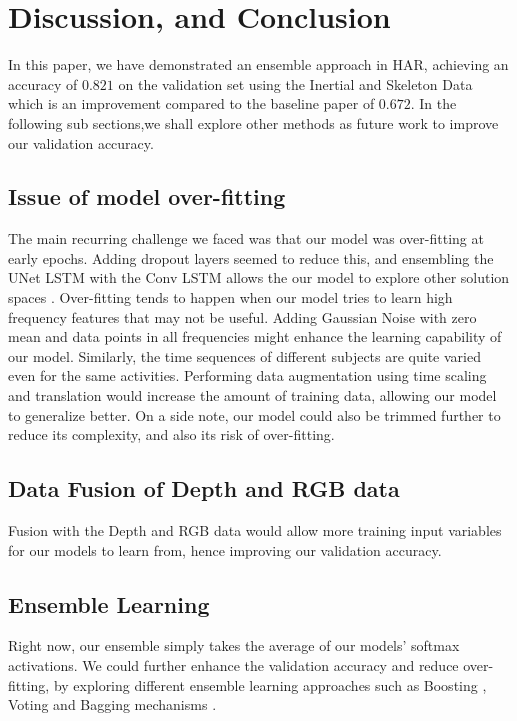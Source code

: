 \documentclass[conference]{IEEEtran}
\begin{document}
\section{Discussion, and Conclusion}
In this paper, we have demonstrated an ensemble approach in HAR, achieving an accuracy of $0.821$ on the validation set using the Inertial and Skeleton Data which is an improvement compared to the baseline paper of $0.672$. In the following sub sections,we shall explore other methods as future work to improve our validation accuracy. 
\subsection{Issue of model over-fitting}
The main recurring challenge we faced was that our model was over-fitting at early epochs. Adding dropout layers seemed to reduce this, and ensembling the UNet LSTM with the Conv LSTM allows the our model to explore other solution spaces \cite{abs-1106-0257}. Over-fitting tends to happen when our model tries to learn high frequency features that may not be useful. Adding Gaussian Noise with zero mean and data points in all frequencies might enhance the learning capability of our model. Similarly, the time sequences of different subjects are quite varied even for the same activities. Performing data augmentation using time scaling and translation would increase the amount of training data, allowing our model to generalize better. On a side note, our model could also be trimmed further to reduce its complexity, and also its risk of over-fitting.
\subsection{Data Fusion of Depth and RGB data}
Fusion with the Depth and RGB data would allow more training input variables for our models to learn from, hence improving our validation accuracy. 
\subsection{Ensemble Learning}
Right now, our ensemble simply takes the average of our models’ softmax activations. We could further enhance the validation accuracy and reduce over-fitting, by exploring different ensemble learning approaches \cite{ensembleML} such as Boosting \cite{boosting}, Voting and Bagging mechanisms \cite{weaklearnability}. 
\end{document}
